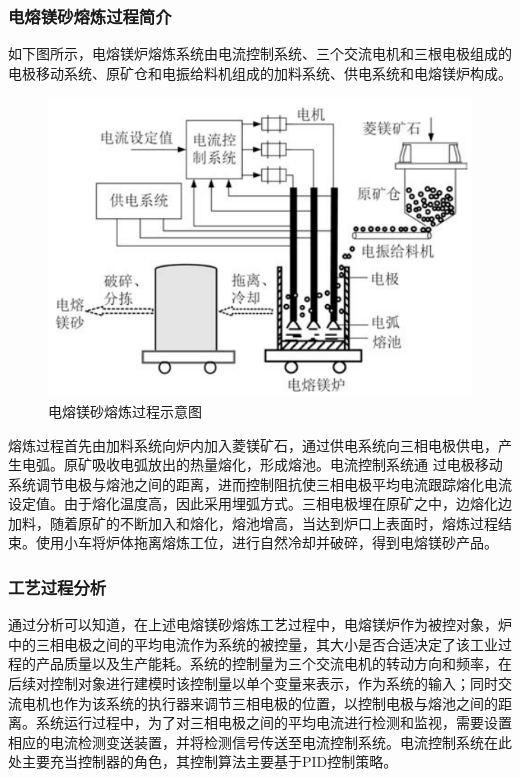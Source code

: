 \documentclass[UTF8, 12pt]{article}
\begin{document}
\subsubsection{电熔镁砂熔炼过程简介}
如下图所示，电熔镁炉熔炼系统由电流控制系统、三个交流电机和三根电极组成的电极移动系统、原矿仓和电振给料机组成的加料系统、供电系统和电熔镁炉构成。
\begin{figure}[H]
    \centering %
    \includegraphics[width=.8\textwidth]{figure/电熔镁砂熔炼过程示意图.png} 
    \caption{电熔镁砂熔炼过程示意图} %
\end{figure}

熔炼过程首先由加料系统向炉内加入菱镁矿石，通过供电系统向三相电极供电，产生电弧。原矿吸收电弧放出的热量熔化，形成熔池。电流控制系统通
过电极移动系统调节电极与熔池之间的距离，进而控制阻抗使三相电极平均电流跟踪熔化电流设定值。由于熔化温度高，因此采用埋弧方式。三相电极埋在原矿之中，边熔化边加料，随着原矿的不断加入和熔化，熔池增高，当达到炉口上表面时，熔炼过程结束。使用小车将炉体拖离熔炼工位，进行自然冷却并破碎，得到电熔镁砂产品。

\subsubsection{工艺过程分析}



通过分析可以知道，在上述电熔镁砂熔炼工艺过程中，电熔镁炉作为被控对象，炉中的三相电极之间的平均电流作为系统的被控量，其大小是否合适决定了该工业过程的产品质量以及生产能耗。系统的控制量为三个交流电机的转动方向和频率，在后续对控制对象进行建模时该控制量以单个变量来表示，作为系统的输入；同时交流电机也作为该系统的执行器来调节三相电极的位置，以控制电极与熔池之间的距离。系统运行过程中，为了对三相电极之间的平均电流进行检测和监视，需要设置相应的电流检测变送装置，并将检测信号传送至电流控制系统。电流控制系统在此处主要充当控制器的角色，其控制算法主要基于PID控制策略。
\end{document}
